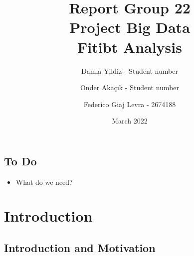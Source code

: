 \documentclass{report}
\title{Report Group 22\\[3ex]
Project Big Data\\[3ex]
Fitibt Analysis \\}
\author{Damla Yildiz - Student number}
\author{Onder Akaçık - Student number}
\author{Federico Giaj Levra - 2674188}
\date{March 2022}
\begin{document}
\maketitle

\section*{To Do}

\begin{itemize}
    \item What do we need?
\end{itemize}

\chapter{Introduction}
\section{Introduction and Motivation}

 
 
\end{document}
